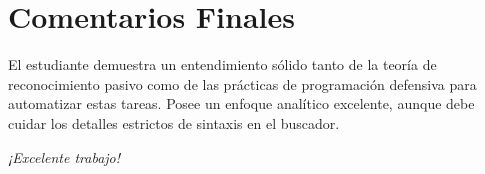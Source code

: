 \documentclass[12pt,a4paper]{article}
\begin{document}
\vspace{1cm}

\section*{Comentarios Finales}
\noindent El estudiante demuestra un entendimiento sólido tanto de la teoría de reconocimiento pasivo como de las prácticas de programación defensiva para automatizar estas tareas. Posee un enfoque analítico excelente, aunque debe cuidar los detalles estrictos de sintaxis en el buscador.

\vspace{0.5cm}
\begin{center}
    \textit{¡Excelente trabajo!}
\end{center}
\end{document}
